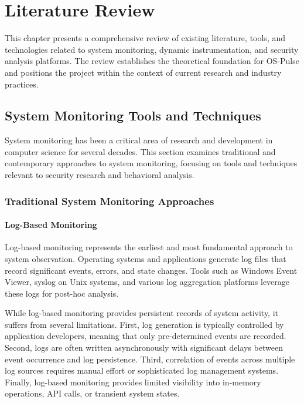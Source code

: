 \chapter{Literature Review}

This chapter presents a comprehensive review of existing literature, tools, and technologies related to system monitoring, dynamic instrumentation, and security analysis platforms. The review establishes the theoretical foundation for OS-Pulse and positions the project within the context of current research and industry practices.

\section{System Monitoring Tools and Techniques}

System monitoring has been a critical area of research and development in computer science for several decades. This section examines traditional and contemporary approaches to system monitoring, focusing on tools and techniques relevant to security research and behavioral analysis.

\subsection{Traditional System Monitoring Approaches}

\subsubsection{Log-Based Monitoring}
Log-based monitoring represents the earliest and most fundamental approach to system observation. Operating systems and applications generate log files that record significant events, errors, and state changes. Tools such as Windows Event Viewer, syslog on Unix systems, and various log aggregation platforms leverage these logs for post-hoc analysis.

While log-based monitoring provides persistent records of system activity, it suffers from several limitations. First, log generation is typically controlled by application developers, meaning that only pre-determined events are recorded. Second, logs are often written asynchronously with significant delays between event occurrence and log persistence. Third, correlation of events across multiple log sources requires manual effort or sophisticated log management systems. Finally, log-based monitoring provides limited visibility into in-memory operations, API calls, or transient system states.

